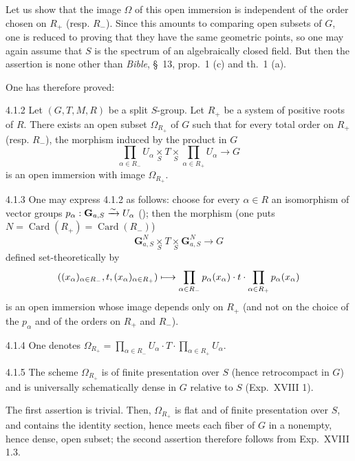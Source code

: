 Let us show that the image $\Omega$ of this open immersion is independent of the order chosen on $R_+$ (resp. $R_-$). Since this amounts to comparing open subsets of $G$, one is reduced to proving that they have the same geometric points, so one may again assume that $S$ is the spectrum of an algebraically closed field. But then the assertion is none other than \textit{Bible}, \S~13, prop.~1 (c) and th.~1 (a).

One has therefore proved:
\begin{proposition}{4.1.2}\label{XXII.4.1.2}
Let $(G,T,M,R)$ be a split $S$-group. Let $R_+$ be a system of positive roots of $R$. There exists an open subset $\Omega_{R_+}$ of $G$ such that for every total order on $R_+$ (resp. $R_-$), the morphism induced by the product in $G$
\[
\prod_{\alpha\in R_-}U_\alpha\underset S\times T\underset S\times\prod_{\alpha\in R_+}U_\alpha\to G
\]
is an open immersion with image $\Omega_{R_+}$.
\end{proposition}
\begin{remark}{4.1.3}\label{XXII.4.1.3}
One may express 4.1.2 as follows: choose for every $\alpha\in R$ an isomorphism of vector groups $p_\alpha:\mathbf G_{a,S}\xrightarrow{\sim} U_\alpha$ (); then the morphism (one puts $N=\operatorname{Card}(R_+)=\operatorname{Card}(R_-)$)
\[
\mathbf G_{a,S}^N\underset S\times T\underset S\times\mathbf G_{a,S}^N\to G
\]
defined set-theoretically by
\[
((x_\alpha)_{\alpha\in R_-},t,(x_\alpha)_{\alpha\in R_+})\longmapsto
\prod_{\alpha\in R_-}p_\alpha(x_\alpha)\cdot t\cdot\prod_{\alpha\in R_+}p_\alpha(x_\alpha)
\]
is an open immersion whose image depends only on $R_+$ (and not on the choice of the $p_\alpha$ and of the orders on $R_+$ and $R_-$).
\end{remark}
\begin{notation}{4.1.4}\label{XXII.4.1.4}
One denotes $\Omega_{R_+}=\prod_{\alpha\in R_-}U_\alpha\cdot T\cdot\prod_{\alpha\in R_+}U_\alpha$.{\renewcommand{\thefootnote}{(9)}}
\end{notation}
\begin{proposition}{4.1.5}\label{XXII.4.1.5}
The scheme $\Omega_{R_+}$ is of finite presentation over $S$ (hence retrocompact in $G$) and is universally schematically dense in $G$ relative to $S$ (\cf Exp.~XVIII 1).
\end{proposition}
The first assertion is trivial. Then,{\renewcommand{\thefootnote}{(10)}} $\Omega_{R_+}$ is flat and of finite presentation over $S$, and contains the identity section, hence meets each fiber of $G$ in a nonempty, hence dense, open subset; the second assertion therefore follows from Exp.~XVIII 1.3{\renewcommand{\thefootnote}{(11)}}.
